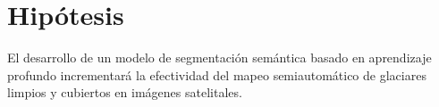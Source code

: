 \section{Hipótesis}
\label{sec:Hipotesis}

El desarrollo de un modelo de segmentación semántica basado en aprendizaje profundo incrementará la efectividad del mapeo semiautomático de glaciares limpios y cubiertos en imágenes satelitales.